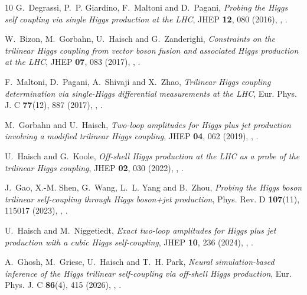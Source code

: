 \documentclass{SciPost}
\begin{document}
\begin{thebibliography}{10}
G.~Degrassi, P.~P. Giardino, F.~Maltoni and D.~Pagani,
\newblock \emph{{Probing the Higgs self coupling via single Higgs production at the LHC}},
\newblock JHEP \textbf{12}, 080 (2016),
\newblock {},
\newblock {}.

W.~Bizon, M.~Gorbahn, U.~Haisch and G.~Zanderighi,
\newblock \emph{{Constraints on the trilinear Higgs coupling from vector boson fusion and associated Higgs production at the LHC}},
\newblock JHEP \textbf{07}, 083 (2017),
\newblock {},
\newblock {}.

F.~Maltoni, D.~Pagani, A.~Shivaji and X.~Zhao,
\newblock \emph{{Trilinear Higgs coupling determination via single-Higgs differential measurements at the LHC}},
\newblock Eur. Phys. J. C \textbf{77}(12), 887 (2017),
\newblock {},
\newblock {}.

M.~Gorbahn and U.~Haisch,
\newblock \emph{{Two-loop amplitudes for Higgs plus jet production involving a modified trilinear Higgs coupling}},
\newblock JHEP \textbf{04}, 062 (2019),
\newblock {},
\newblock {}.

U.~Haisch and G.~Koole,
\newblock \emph{{Off-shell Higgs production at the LHC as a probe of the trilinear Higgs coupling}},
\newblock JHEP \textbf{02}, 030 (2022),
\newblock {},
\newblock {}.

J.~Gao, X.-M. Shen, G.~Wang, L.~L. Yang and B.~Zhou,
\newblock \emph{{Probing the Higgs boson trilinear self-coupling through Higgs boson+jet production}},
\newblock Phys. Rev. D \textbf{107}(11), 115017 (2023),
\newblock {},
\newblock {}.

U.~Haisch and M.~Niggetiedt,
\newblock \emph{{Exact two-loop amplitudes for Higgs plus jet production with a cubic Higgs self-coupling}},
\newblock JHEP \textbf{10}, 236 (2024),
\newblock {},
\newblock {}.

A.~Ghosh, M.~Griese, U.~Haisch and T.~H. Park,
\newblock \emph{{Neural simulation-based inference of the Higgs trilinear self-coupling via off-shell Higgs production}},
\newblock Eur. Phys. J. C \textbf{86}(4), 415 (2026),
\newblock {},
\newblock {}.


\end{thebibliography}
\end{document}
